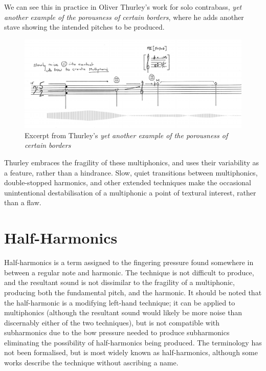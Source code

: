   We can see this in practice in Oliver Thurley's work for solo contrabass, \emph{yet another example of the porousness of certain borders}, where he adds another stave showing the intended pitches to be produced.\autocite{thurleyAnotherExamplePorousness2014}

  \begin{figure}
    \includegraphics[width=\linewidth]{./resources/thurleyMultiphonicNotation.png}
    \caption{Excerpt from Thurley's \emph{yet another example of the porousness of certain borders}\autocite[]{thurleyAnotherExamplePorousness2014}}
\label{fig:Excerpt from Thurley's `yet another example of the porousness of certain borders'}
  \end{figure}

Thurley embraces the fragility of these multiphonics, and uses their variability as a feature, rather than a hindrance. 
Slow, quiet transitions between multiphonics, double-stopped harmonics, and other extended techniques make the occasional unintentional destabilisation of a multiphonic a point of textural interest, rather than a flaw.

\newpage
\section{Half-Harmonics} \label{sec:halfHarmonicsDiscussion}
Half-harmonics is a term assigned to the fingering pressure found somewhere in between a regular note and harmonic. 
The technique is not difficult to produce, and the resultant sound is not dissimilar to the fragility of a multiphonic, producing both the fundamental pitch, and the harmonic. 
It should be noted that the half-harmonic is a modifying left-hand technique; it can be applied to multiphonics (although the resultant sound would likely be more noise than discernably either of the two techniques), but is not compatible with subharmonics due to the bow pressure needed to produce subharmonics eliminating the possibility of half-harmonics being produced.
The terminology has not been formalised, but is most widely known as half-harmonics, although some works describe the technique without ascribing a name.

